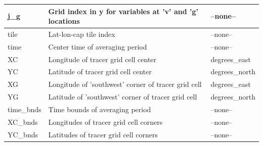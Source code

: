 \begin{longtable}{|m{}|m{}|m{}|}
j\_g &Grid index in y for variables at 'v' and 'g' locations &--none--  \\ \hline
tile &Lat-lon-cap tile index &--none--  \\ \hline
time &Center time of averaging period &--none--  \\ \hline
XC &Longitude of tracer grid cell center &degrees\_east  \\ \hline
YC &Latitude of tracer grid cell center &degrees\_north  \\ \hline
XG &Longitude of 'southwest' corner of tracer grid cell &degrees\_east  \\ \hline
YG &Latitude of 'southwest' corner of tracer grid cell &degrees\_north  \\ \hline
time\_bnds &Time bounds of averaging period &--none--  \\ \hline
XC\_bnds &Longitudes of tracer grid cell corners &--none--  \\ \hline
YC\_bnds &Latitudes of tracer grid cell corners &--none--  \\ \hline
\end{longtable}

\newp
\pagebreak
